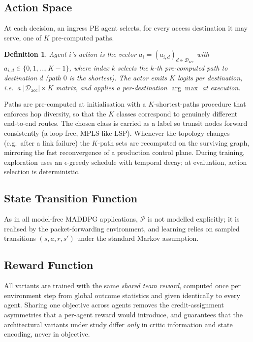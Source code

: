 \documentclass[10pt,journal,comsoc]{IEEEtran}
\newtheorem{definition}{Definition}
\begin{document}
\subsection{Action Space}
At each decision, an ingress PE agent selects, for every access destination it may serve, one of $K$ pre-computed paths.

\begin{definition}
  \label{def:action_space}
  Agent $i$'s action is the vector $a_i = (a_{i,d})_{d \in \mathcal{D}_{\text{acc}}}$ with $a_{i,d} \in \{0,1,\dots,K-1\}$, where index $k$ selects the $k$-th pre-computed path to destination $d$ (path $0$ is the shortest). The actor emits $K$ logits per destination, i.e.\ a $|\mathcal{D}_{\text{acc}}|\times K$ matrix, and applies a per-destination $\arg\max$ at execution.
\end{definition}

Paths are pre-computed at initialisation with a $K$-shortest-paths procedure that enforces hop diversity, so that the $K$ classes correspond to genuinely different end-to-end routes. The chosen class is carried as a label so transit nodes forward consistently (a loop-free, MPLS-like LSP). Whenever the topology changes (e.g.\ after a link failure) the $K$-path sets are recomputed on the surviving graph, mirroring the fast reconvergence of a production control plane. During training, exploration uses an $\epsilon$-greedy schedule with temporal decay; at evaluation, action selection is deterministic.

\subsection{State Transition Function}
As in all model-free MADDPG applications, $\mathcal{P}$ is not modelled explicitly; it is realised by the packet-forwarding environment, and learning relies on sampled transitions $(s,a,r,s')$ under the standard Markov assumption.

\subsection{Reward Function}
All variants are trained with the same \emph{shared team reward}, computed once per environment step from global outcome statistics and given identically to every agent. Sharing one objective across agents removes the credit-assignment asymmetries that a per-agent reward would introduce, and guarantees that the architectural variants under study differ \emph{only} in critic information and state encoding, never in objective.
\end{document}

